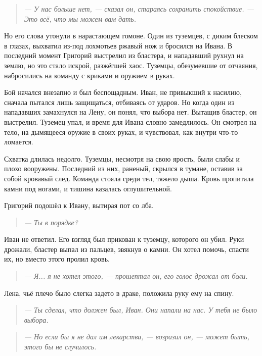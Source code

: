 \documentclass[12pt,a4paper]{book}
\newenvironment{dialogue}{\begin{quote}\itshape}{\end{quote}}
\begin{document}
\begin{dialogue}
--- У нас больше нет, --- сказал он, стараясь сохранить спокойствие. --- Это всё, что мы можем вам дать.
\end{dialogue}

Но его слова утонули в нарастающем гомоне. Один из туземцев, с диким блеском в глазах, выхватил из-под лохмотьев ржавый нож и бросился на Ивана. В последний момент Григорий выстрелил из бластера, и нападавший рухнул на землю, но это стало искрой, разжёгшей хаос. Туземцы, обезумевшие от отчаяния, набросились на команду с криками и оружием в руках.

Бой начался внезапно и был беспощадным. Иван, не привыкший к насилию, сначала пытался лишь защищаться, отбиваясь от ударов. Но когда один из нападавших замахнулся на Лену, он понял, что выбора нет. Вытащив бластер, он выстрелил. Туземец упал, и время для Ивана словно замедлилось. Он смотрел на тело, на дымящееся оружие в своих руках, и чувствовал, как внутри что-то ломается.

Схватка длилась недолго. Туземцы, несмотря на свою ярость, были слабы и плохо вооружены. Последний из них, раненый, скрылся в тумане, оставив за собой кровавый след. Команда стояла среди тел, тяжело дыша. Кровь пропитала камни под ногами, и тишина казалась оглушительной.

Григорий подошёл к Ивану, вытирая пот со лба.

\begin{dialogue}
--- Ты в порядке?
\end{dialogue}

Иван не ответил. Его взгляд был прикован к туземцу, которого он убил. Руки дрожали, бластер выпал из пальцев, звякнув о камни. Он хотел помочь, спасти их, но вместо этого пролил кровь.

\begin{dialogue}
--- Я... я не хотел этого, --- прошептал он, его голос дрожал от боли.
\end{dialogue}

Лена, чьё плечо было слегка задето в драке, положила руку ему на спину.

\begin{dialogue}
--- Ты сделал, что должен был, Иван. Они напали на нас. У тебя не было выбора.
\end{dialogue}

\begin{dialogue}
--- Но если бы я не дал им лекарства, --- возразил он, --- может быть, этого бы не случилось.
\end{dialogue}
\end{document}
